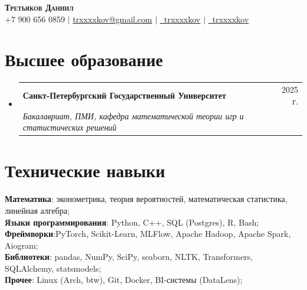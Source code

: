 \documentclass[a4paper, 11pt]{article}
\makeatletter
\newcommand{\resumeSubheading}[4]{
  \vspace{-2pt}\item
    \begin{tabular*}{0.97\textwidth}[t]{l@{\extracolsep{\fill}}r}
      \textbf{#1} & #2 \\
      \textit{\small#3} & \textit{\small #4} \\
    \end{tabular*}\vspace{-7pt}
}
\newcommand{\resumeSubHeadingListStart}{\begin{itemize}[leftmargin=0.15in, label={}]}
\newcommand{\resumeSubHeadingListEnd}{\end{itemize}}
\makeatother
\begin{document}
\begin{center}
    \textbf{\Huge \scshape Третьяков Даниил} \\ \vspace{5pt}
    \small +7 900 656 0859 $|$ \href{mailto:trxxxxkov@gmail.com}{trxxxxkov@gmail.com} $|$
    \href{https://t.me/trxxxxkov}{\faTelegram \ trxxxxkov} $|$  \href{https://github.com/trxxxxkov}{\faGithub \ trxxxxkov}
\end{center}


\section{Высшее образование}
  \resumeSubHeadingListStart
    \resumeSubheading
      {Санкт-Петербургский Государственный Университет}{2025 г.}
      {Бакалавриат, ПМИ, кафедра математической теории игр и статистических решений}
      {}
  \resumeSubHeadingListEnd


\section{Технические навыки}
 \begin{itemize}[leftmargin=0.15in, label={}]
    \small{\item{
        \textbf{Математика}{: эконометрика, теория вероятностей, математическая статистика, линейная алгебра;} \\    
        \vspace{3pt}
        \textbf{Языки программирования}{: Python, C++, SQL (Postgres), R, Bash;} \\
        \vspace{3pt}
        \textbf{Фреймворки}{:PyTorch, Scikit-Learn, MLFlow, Apache Hadoop, Apache Spark, Aiogram;} \\
        \vspace{3pt}
        \textbf{Библиотеки}{: pandas, NumPy, SciPy, seaborn, NLTK, Transformers, SQLAlchemy, statsmodels;} \\
        \vspace{3pt}
        \textbf{Прочее}{: Linux (Arch, btw), Git, Docker, BI-системы (DataLens);} \\
    }}
 \end{itemize}

\end{document}
